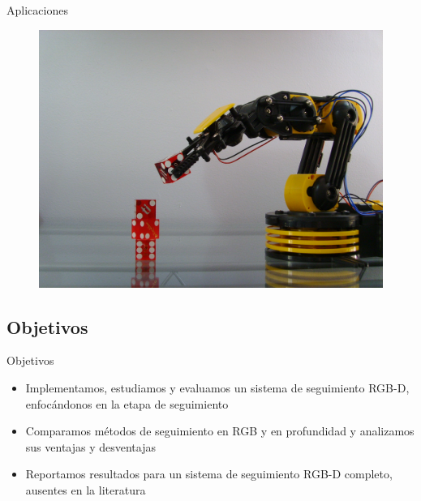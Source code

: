 \documentclass[]{beamer}
\begin{document}
\begin{frame}{Aplicaciones}
    \begin{figure}[t]
        \centering
        \includegraphics[scale=0.12]{img/robot.jpg}
    \end{figure}
\end{frame}


\subsection{Objetivos}
\begin{frame}{Objetivos}

    \begin{itemize}
        \item Implementamos, estudiamos y evaluamos un sistema de seguimiento RGB-D, enfocándonos en la etapa de seguimiento
        \item Comparamos métodos de seguimiento en RGB y en profundidad y analizamos sus ventajas y desventajas
        \item Reportamos resultados para un sistema de seguimiento RGB-D completo, ausentes en la literatura
    \end{itemize}
\end{frame}
\end{document}
